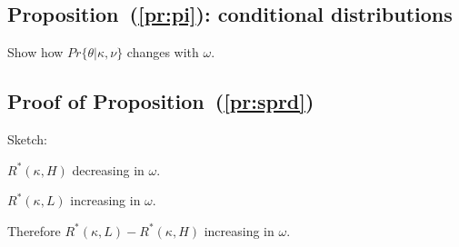 \documentclass[notitlepage]{article}
\begin{document}
\subsection{Proposition~(\ref{pr:pi}): conditional distributions}
\label{app:pr:pi}
Show how $Pr\{\theta|\kappa,\nu\}$ changes with $\omega$.

\subsection{Proof of Proposition~(\ref{pr:sprd})}
Sketch:

$R^{*}(\kappa,H)$ decreasing in $\omega$.

$R^{*}(\kappa,L)$ increasing in $\omega$.

Therefore $R^{*}(\kappa,L)-R^{*}(\kappa,H)$ increasing in $\omega$.
\end{document}
